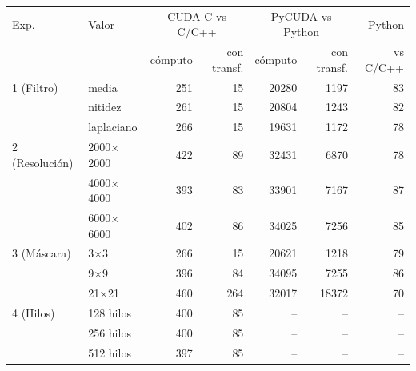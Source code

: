 \begin{tabular}{llrrrrr}
\toprule
Exp. & Valor & \multicolumn{2}{c}{CUDA C vs C/C++} & \multicolumn{2}{c}{PyCUDA vs Python} & Python \\
 & & cómputo & con transf. & cómputo & con transf. & vs C/C++ \\
\midrule
1 (Filtro) & media & 251 & 15 & 20280 & 1197 & 83 \\
 & nitidez & 261 & 15 & 20804 & 1243 & 82 \\
 & laplaciano & 266 & 15 & 19631 & 1172 & 78 \\
\midrule
2 (Resolución) & 2000$\times$2000 & 422 & 89 & 32431 & 6870 & 78 \\
 & 4000$\times$4000 & 393 & 83 & 33901 & 7167 & 87 \\
 & 6000$\times$6000 & 402 & 86 & 34025 & 7256 & 85 \\
\midrule
3 (Máscara) & 3$\times$3 & 266 & 15 & 20621 & 1218 & 79 \\
 & 9$\times$9 & 396 & 84 & 34095 & 7255 & 86 \\
 & 21$\times$21 & 460 & 264 & 32017 & 18372 & 70 \\
\midrule
4 (Hilos) & 128 hilos & 400 & 85 & -- & -- & -- \\
 & 256 hilos & 400 & 85 & -- & -- & -- \\
 & 512 hilos & 397 & 85 & -- & -- & -- \\
\bottomrule
\end{tabular}
